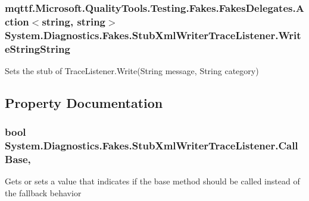 \hypertarget{class_system_1_1_diagnostics_1_1_fakes_1_1_stub_xml_writer_trace_listener_ad3c874c0cbce16d41a49e12ad49f72a7}{
\subsubsection[{Write\-String\-String}]{\setlength{\rightskip}{0pt plus 5cm}mqttf.\-Microsoft.\-Quality\-Tools.\-Testing.\-Fakes.\-Fakes\-Delegates.\-Action$<$string, string$>$ System.\-Diagnostics.\-Fakes.\-Stub\-Xml\-Writer\-Trace\-Listener.\-Write\-String\-String}}\label{class_system_1_1_diagnostics_1_1_fakes_1_1_stub_xml_writer_trace_listener_ad3c874c0cbce16d41a49e12ad49f72a7}


Sets the stub of Trace\-Listener.\-Write(\-String message, String category)



\subsection{Property Documentation}
\hypertarget{class_system_1_1_diagnostics_1_1_fakes_1_1_stub_xml_writer_trace_listener_a86bfbe7054bcc32c497b4a731e640ba1}{
\subsubsection[{Call\-Base}]{\setlength{\rightskip}{0pt plus 5cm}bool System.\-Diagnostics.\-Fakes.\-Stub\-Xml\-Writer\-Trace\-Listener.\-Call\-Base\hspace{0.3cm}{\ttfamily [get]}, {\ttfamily [set]}}}\label{class_system_1_1_diagnostics_1_1_fakes_1_1_stub_xml_writer_trace_listener_a86bfbe7054bcc32c497b4a731e640ba1}


Gets or sets a value that indicates if the base method should be called instead of the fallback behavior

